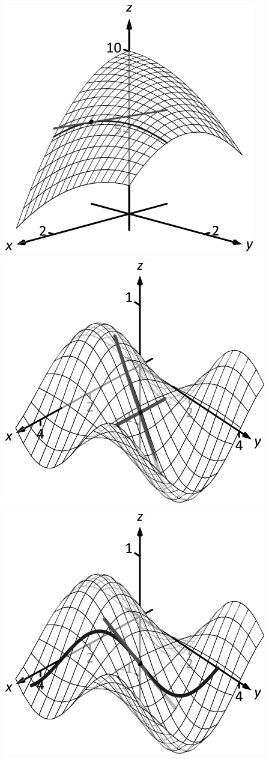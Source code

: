 \documentclass[10pt]{article}
\begin{document}
\includegraphics{figpartial3b_3DBW.pdf}
\texttt{}

\includegraphics{figpartial4a_3DBW.pdf}
\texttt{}

\includegraphics{figpartial4b_3DBW.pdf}
\texttt{}
\end{document}

